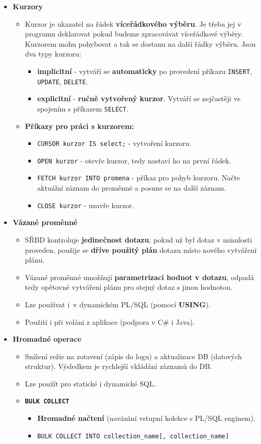 \begin{itemize}
\item\textbf{Kurzory}
\begin{itemize}
\item Kurzor je ukazatel na řádek \textbf{víceřádkového výběru}. Je třeba jej v programu deklarovat pokud budeme zpracovávat víceřádkové výběry. Kurzorem mohu pohybovat a tak se dostanu na další řádky výběru. Jsou dva typy kurzoru:
\begin{itemize}
\item \textbf{implicitní} - vytváří se \textbf{automaticky} po provedení příkazu \texttt{INSERT}, \texttt{UPDATE}, \texttt{DELETE}.
\item \textbf{explicitní} - \textbf{ručně vytvořený kurzor}. Vytváří se nejčastěji ve spojením s příkazem \texttt{SELECT}.
\end{itemize}
\item \textbf{Příkazy pro práci s kurzorem:}
\begin{itemize}
\item \texttt{CURSOR kurzor IS select;} - vytvoření kurzoru.
\item \texttt{OPEN kurzor} - otevře kurzor, tedy nastaví ho na první řádek.
\item \texttt{FETCH kurzor INTO promena} - příkaz pro pohyb kurzoru. Načte aktuální záznam do proměnné a posune se na další záznam.
\item \texttt{CLOSE kurzor} - uzavře kurzor.
\end{itemize}
\end{itemize}


\item\textbf{Vázané proměnné}
\begin{itemize}
\item SŘBD kontroluje \textbf{jedinečnost dotazu}, pokud už byl dotaz v minulosti proveden, použije se \textbf{dříve použitý plán} dotazu místo nového vytváření plánu.
\item Vázané proměnné umožňují \textbf{parametrizaci hodnot v dotazu}, odpadá tedy opětovné vytváření plánu pro stejný dotaz s jinou hodnotou.
\item Lze používat i v dynamickém PL/SQL (pomocí \textbf{USING}).
\item Použití i při voláni z aplikace (podpora v C\# i Java).
\end{itemize}



\item\textbf{Hromadné operace}
\begin{itemize}
\item Snížení režie na zotavení (zápis do logu) a aktualizace DB (datových struktur). Výsledkem je rychlejší vkládání záznamů do DB.
\item Lze použít pro statické i dynamické SQL.
\item \textbf{\texttt{BULK COLLECT}}
\begin{itemize}
\item \textbf{Hromadné načtení} (navázání vstupní kolekce s PL/SQL enginem).
\item \texttt{BULK COLLECT INTO collection\_name[, collection\_name]}
\end{itemize}


\end{itemize}
\end{itemize}

